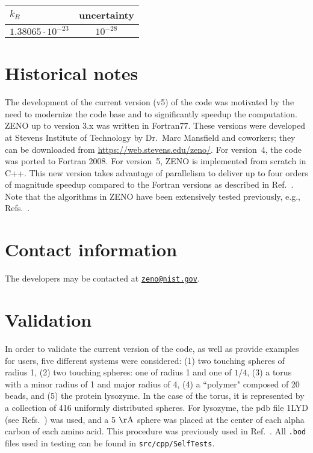 \documentclass[12pt,letterpaper]{article}
\begin{document}
\noindent \begin{tabular}{| l | c |}
\hline $k_B$ & uncertainty \\
\hline\hline $1.38065 \cdot 10^{-23}$ & $10^{-28}$ \\
\hline
\end{tabular}

\section{Historical notes}

The development of the current version (v5) of the code was motivated by the need to modernize the code base and to significantly speedup the computation. ZENO up to version 3.x was written in Fortran77. These versions were developed at Stevens Institute of Technology by Dr.~Marc Mansfield and coworkers; they can be downloaded from \url{https://web.stevens.edu/zeno/}.  For version~4, the code was ported to Fortran 2008.  For version~5, ZENO is implemented from scratch in C++.  This new version takes advantage of parallelism to deliver up to four orders of magnitude  speedup compared to the Fortran versions as described in Ref.~\cite{Juba2016}. Note that the algorithms in ZENO have been extensively tested previously, e.g., Refs.~\cite{Mansfield2008,Mansfield2001}. 

\section{Contact information}

The developers may be contacted at \href{mailto:zeno@nist.gov}{\texttt{zeno@nist.gov}}.

\section{Validation}

In order to validate the current version of the code, as well as provide examples for users, five different systems were considered: (1) two touching spheres of radius 1, (2) two touching spheres: one of radius 1 and one of $1/4$, (3) a torus with a minor radius of 1 and major radius of 4, (4) a ``polymer" composed of 20 beads, and (5) the protein lysozyme. In the case of the torus, it is represented by a collection of 416 uniformly distributed spheres. For lysozyme, the pdb file 1LYD (see Refs.~\cite{pdbonline,pdb}) was used, and a 5 $\mathrm{\AA}$ sphere was placed at the center of each alpha carbon of each amino acid. This procedure was previously used in Ref.~\cite{Kang2004}. All \texttt{.bod} files used in testing can be found in \texttt{src/cpp/SelfTests}. \\
\end{document}

